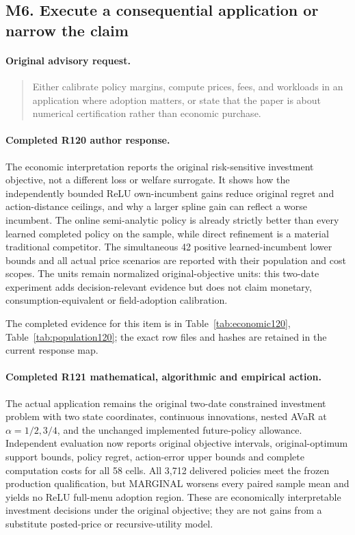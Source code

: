 \subsection{M6. Execute a consequential application or narrow the claim}
\label{response122:M6}

\paragraph{Original advisory request.}
\begin{quote}
Either calibrate policy margins, compute prices, fees, and workloads in an application where adoption matters, or state that the paper is about numerical certification rather than economic purchase.
\end{quote}

\paragraph{Completed R120 author response.}
The economic interpretation reports the original risk-sensitive investment objective, not a different loss or welfare surrogate. It shows how the independently bounded ReLU own-incumbent gains reduce original regret and action-distance ceilings, and why a larger spline gain can reflect a worse incumbent. The online semi-analytic policy is already strictly better than every learned completed policy on the sample, while direct refinement is a material traditional competitor. The simultaneous 42 positive learned-incumbent lower bounds and all actual price scenarios are reported with their population and cost scopes. The units remain normalized original-objective units: this two-date experiment adds decision-relevant evidence but does not claim monetary, consumption-equivalent or field-adoption calibration.

The completed evidence for this item is in Table~\ref{tab:economic120}, Table~\ref{tab:population120}; the exact row files and hashes are retained in the current response map.

\paragraph{Completed R121 mathematical, algorithmic and empirical action.}
The actual application remains the original two-date constrained investment problem with two state coordinates, continuous innovations, nested AVaR at $\alpha=1/2,3/4$, and the unchanged implemented future-policy allowance. Independent evaluation now reports original objective intervals, original-optimum support bounds, policy regret, action-error upper bounds and complete computation costs for all 58 cells. All 3,712 delivered policies meet the frozen production qualification, but MARGINAL worsens every paired sample mean and yields no ReLU full-menu adoption region. These are economically interpretable investment decisions under the original objective; they are not gains from a substitute posted-price or recursive-utility model.


